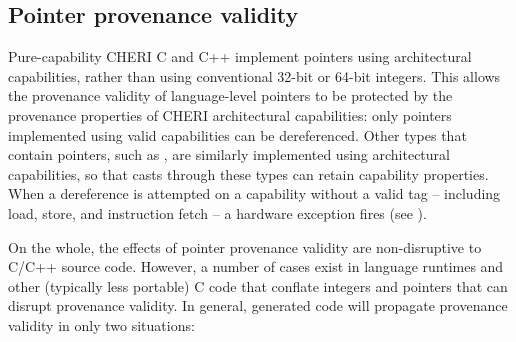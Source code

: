 \documentclass[12pt,twoside,openright,a4paper]{article}
\newcommand{\ccode}[1]{{\small\ttfamily{#1}}}
\newcommand{\cintptrt}{{\ccode{intptr\_t}}\xspace}
\newcommand{\note}[2]{{\color{blue}[ Note: #1 - #2]}}
\renewcommand{\note}[2]{\relax\ifhmode\unskip\fi}
\newcommand{\rwnote}[1]{\note{#1}{Robert W.}}
\begin{document}
\rwnote{We've opted to use the term ``hardware exception'' throughout, and
  mention ``traps'' only here.  This could cause confusion with respect to C++
  exceptions .. but perhaps less so than if we used the word ``exception''
  unadorned.}

\subsection{Pointer provenance validity}
\label{sec:pointer_provenance_validity}

Pure-capability CHERI C and C++ implement pointers using architectural
capabilities, rather than using conventional 32-bit or 64-bit integers.
This allows the provenance validity of language-level pointers to be
protected by the provenance properties of CHERI architectural capabilities:
only pointers implemented using valid capabilities can be dereferenced.
Other types that contain pointers, such as \cintptrt, are similarly implemented
using architectural capabilities, so that casts through these types
can retain capability properties.
When a dereference is attempted on a capability without a valid tag --
including load, store, and instruction fetch -- a hardware exception fires
(see ).

On the whole, the effects of pointer provenance validity are non-disruptive to
C/C++ source code.
However, a number of cases exist in language runtimes and other
(typically less portable) C code that conflate integers and pointers that can
disrupt provenance validity.
In general, generated code will propagate provenance validity in only two
situations:
\end{document}
